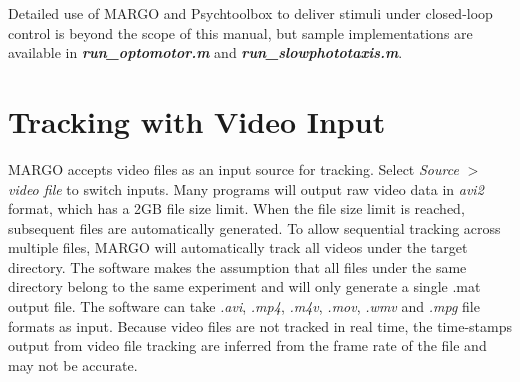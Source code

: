 \documentclass[11pt]{article}
\begin{document}
Detailed use of MARGO and Psychtoolbox to deliver stimuli under closed-loop control is beyond the scope of this manual, but sample implementations are available in \textbf{\textit{run\_optomotor.m}} and \textbf{\textit{run\_slowphototaxis.m}}.




\newpage
\section{Tracking with Video Input}

MARGO accepts video files as an input source for tracking. Select \textit{Source} $>$ \textit{video file} to switch inputs. Many programs will output raw video data in \textit{avi2} format, which has a 2GB file size limit. When the file size limit is reached, subsequent files are automatically generated. To allow sequential tracking across multiple files, MARGO will automatically track all videos under the target directory. The software makes the assumption that all files under the same directory belong to the same experiment and will only generate a single .mat output file. The software can take \textit{.avi}, \textit{.mp4}, \textit{.m4v}, \textit{.mov}, \textit{.wmv} and \textit{.mpg} file formats as input. Because video files are not tracked in real time, the time-stamps output from video file tracking are inferred from the frame rate of the file and may not be accurate.
\end{document}
